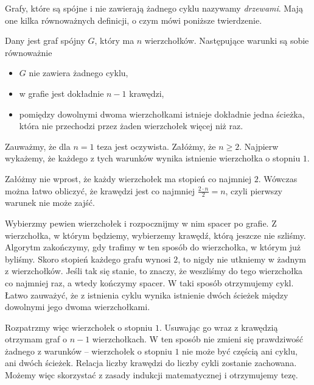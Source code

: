 \vspace{10px}

\noindent
Grafy, które są spójne i nie zawierają żadnego cyklu nazywamy \textit{drzewami}. Mają one kilka równoważnych definicji, o czym mówi poniższe twierdzenie.

\vspace{5px}


\noindent
Dany jest graf spójny $G$, który ma $n$ wierzchołków. Następujące warunki są sobie równoważnie
\begin{itemize}
    \item $G$ nie zawiera żadnego cyklu,
    \item w grafie jest dokładnie $n - 1$ krawędzi,
    \item pomiędzy dowolnymi dwoma wierzchołkami istnieje dokładnie jedna ścieżka, która nie przechodzi przez żaden wierzchołek więcej niż raz.
\end{itemize}


\noindent
Zauważmy, że dla $n = 1$ teza jest oczywista. Załóżmy, że $n \geqslant 2$. Najpierw wykażemy, że każdego z tych warunków wynika istnienie wierzchołka o stopniu $1$.

\vspace{10 px}
\noindent
Załóżmy nie wprost, że każdy wierzchołek ma stopień co najmniej $2$. Wówczas można łatwo obliczyć, że krawędzi jest co najmniej $\frac{2 \cdot n}{2} = n$, czyli pierwszy warunek nie może zajść.

\vspace{10 px}
\noindent
Wybierzmy pewien wierzchołek i rozpocznijmy w nim spacer po grafie. Z wierzchołka, w którym będziemy, wybierzemy krawędź, którą jeszcze nie szliśmy. Algorytm zakończymy, gdy trafimy w ten sposób do wierzchołka, w którym już byliśmy. Skoro stopień każdego grafu wynosi $2$, to nigdy nie utkniemy w żadnym z wierzchołków. Jeśli tak się stanie, to znaczy, że weszliśmy do tego wierzchołka co najmniej raz, a wtedy kończymy spacer. W taki sposób otrzymujemy cykl. Łatwo zauważyć, że z istnienia cyklu wynika istnienie dwóch ścieżek między dowolnymi jego dwoma wierzchołkami.

\vspace{10 px}
\noindent
Rozpatrzmy więc wierzchołek o stopniu $1$. Usuwając go wraz z krawędzią otrzymam graf o $n - 1$ wierzchołkach. W ten sposób nie zmieni się prawdziwość żadnego z warunków -- wierzchołek o stopniu $1$ nie może być częścią ani cyklu, ani dwóch ścieżek. Relacja liczby krawędzi do liczby cykli zostanie zachowana. Możemy więc skorzystać z zasady indukcji matematycznej i otrzymujemy tezę.

